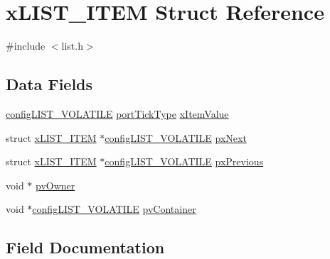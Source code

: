 \hypertarget{structx_l_i_s_t___i_t_e_m}{}\section{x\+L\+I\+S\+T\+\_\+\+I\+T\+EM Struct Reference}
\label{structx_l_i_s_t___i_t_e_m}


{\ttfamily \#include $<$list.\+h$>$}

\subsection*{Data Fields}
\begin{DoxyCompactItemize}
\item 
\mbox{\hyperlink{list_8h_a2d5de557c5561c8980d1bf51d87d8cba}{config\+L\+I\+S\+T\+\_\+\+V\+O\+L\+A\+T\+I\+LE}} \mbox{\hyperlink{portmacro_8h_a4d746b2ff8fafc490b764c66411ec457}{port\+Tick\+Type}} \mbox{\hyperlink{structx_l_i_s_t___i_t_e_m_acdfef3a9fbae98cef8adc272850ef31c}{x\+Item\+Value}}
\item 
struct \mbox{\hyperlink{structx_l_i_s_t___i_t_e_m}{x\+L\+I\+S\+T\+\_\+\+I\+T\+EM}} $\ast$\mbox{\hyperlink{list_8h_a2d5de557c5561c8980d1bf51d87d8cba}{config\+L\+I\+S\+T\+\_\+\+V\+O\+L\+A\+T\+I\+LE}} \mbox{\hyperlink{structx_l_i_s_t___i_t_e_m_a03713c4ee953ef5ca6adbec883720c60}{px\+Next}}
\item 
struct \mbox{\hyperlink{structx_l_i_s_t___i_t_e_m}{x\+L\+I\+S\+T\+\_\+\+I\+T\+EM}} $\ast$\mbox{\hyperlink{list_8h_a2d5de557c5561c8980d1bf51d87d8cba}{config\+L\+I\+S\+T\+\_\+\+V\+O\+L\+A\+T\+I\+LE}} \mbox{\hyperlink{structx_l_i_s_t___i_t_e_m_ae8e553eae41010a8e41c66d76c94110b}{px\+Previous}}
\item 
void $\ast$ \mbox{\hyperlink{structx_l_i_s_t___i_t_e_m_aeb3110b50fe0dbce826d929b27b5ddb1}{pv\+Owner}}
\item 
void $\ast$\mbox{\hyperlink{list_8h_a2d5de557c5561c8980d1bf51d87d8cba}{config\+L\+I\+S\+T\+\_\+\+V\+O\+L\+A\+T\+I\+LE}} \mbox{\hyperlink{structx_l_i_s_t___i_t_e_m_a341462d06236aa07eaf1a864e4b59951}{pv\+Container}}
\end{DoxyCompactItemize}


\subsection{Field Documentation}
\mbox{\label{structx_l_i_s_t___i_t_e_m_a341462d06236aa07eaf1a864e4b59951}} 
